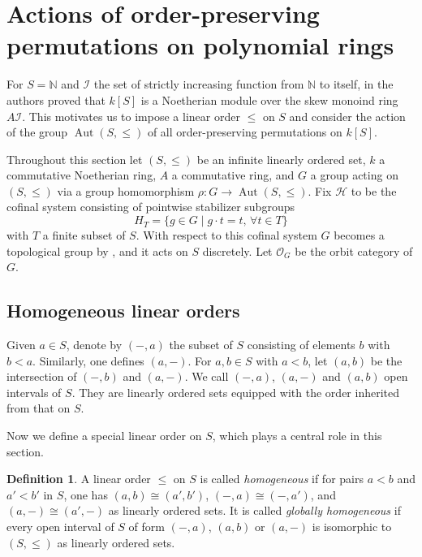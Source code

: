 \documentclass[11pt, reqno]{amsart}
\theoremstyle{plain}
\numberwithin{equation}{section}
\theoremstyle{definition}
\newtheorem{definition}[theorem]{Definition}
\DeclareMathOperator{\Aut}{Aut}
\begin{document}
\section{Actions of order-preserving permutations on polynomial rings}

For $S = \mathbb{N}$ and $\mathcal{I}$ the set of strictly increasing function from $\mathbb{N}$ to itself, in \cite{NR1} the authors proved that $k[S]$ is a Noetherian module over the skew monoind ring $A\mathcal{I}$. This motivates us to impose a linear order $\leqslant$ on $S$ and consider the action of the group $\Aut(S, \leqslant)$ of all order-preserving permutations on $k[S]$.

Throughout this section let $(S, \leqslant)$ be an infinite linearly ordered set, $k$ a commutative Noetherian ring, $A$ a commutative ring, and $G$ a group acting on $(S, \leqslant)$ via a group homomorphism $\rho: G \to \Aut(S, \leqslant)$. Fix $\mathcal{H}$ to be the cofinal system consisting of pointwise stabilizer subgroups
\[
H_T = \{ g \in G \mid g \cdot t = t, \, \forall t \in T \}
\]
with $T$ a finite subset of $S$. With respect to this cofinal system $G$ becomes a topological group by \cite[III.20, Theorem 3]{Hu}, and it acts on $S$ discretely. Let $\mathcal{O}_G$ be the orbit category of $G$.


\subsection{Homogeneous linear orders}

Given $a \in S$, denote by $(-, a)$ the subset of $S$ consisting of elements $b$ with $b < a$. Similarly, one defines $(a, -)$. For $a, b \in S$ with $a < b$, let $(a, b)$ be the intersection of $(-, b)$ and $(a, -)$. We call $(-, a)$, $(a, -)$ and $(a, b)$ open intervals of $S$. They are linearly ordered sets equipped with the order inherited from that on $S$.

Now we define a special linear order on $S$, which plays a central role in this section.

\begin{definition} \label{piecewise homogeneous}
A linear order $\leqslant$ on $S$ is called \textit{homogeneous} if for pairs $a < b$ and $a' < b'$ in $S$, one has $(a, b) \cong (a', b')$, $(-, a) \cong (-, a')$, and $(a, -) \cong (a', -)$ as linearly ordered sets. It is called \textit{globally homogeneous} if every open interval of $S$ of form $(-, a)$, $(a, b)$ or $(a, -)$ is isomorphic to $(S, \leqslant)$ as linearly ordered sets.
\end{definition}
\end{document}
